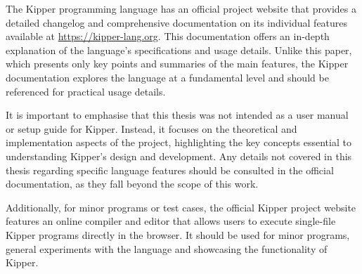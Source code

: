 
The Kipper programming language has an official project website that provides a detailed changelog and comprehensive documentation on its individual features available at \url{https://kipper-lang.org}. This documentation offers an in-depth explanation of the language’s specifications and usage details. Unlike this paper, which presents only key points and summaries of the main features, the Kipper documentation explores the language at a fundamental level and should be referenced for practical usage details.

It is important to emphasise that this thesis was not intended as a user manual or setup guide for Kipper. Instead, it focuses on the theoretical and implementation aspects of the project, highlighting the key concepts essential to understanding Kipper’s design and development. Any details not covered in this thesis regarding specific language features should be consulted in the official documentation, as they fall beyond the scope of this work.

Additionally, for minor programs or test cases, the official Kipper project website features an online compiler and editor that allows users to execute single-file Kipper programs directly in the browser. It should be used for minor programs, general experiments with the language and showcasing the functionality of Kipper.

